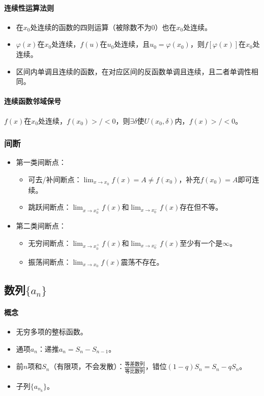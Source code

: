 \documentclass[
12pt, %
a4paper, 
oneside, %
headinclude,footinclude, %
]{scrartcl}
\begin{document}
\paragraph{连续性运算法则}
\begin{itemize}
\item 在$ x_0 $处连续的函数的四则运算（被除数不为$ 0 $）也在$ x_0 $处连续。
\item $ \varphi (x) $在$ x_0 $处连续，$ f(u) $在$ u_0 $处连续，且$ u_0 = \varphi (x_0) $，则$ f[\varphi (x)] $在$ x_0 $处连续。
\item 区间内单调且连续的函数，在对应区间的反函数单调且连续，且二者单调性相同。
\end{itemize}
\paragraph{连续函数邻域保号}
$ f(x) $在$ x_0 $处连续，$ f(x_0) >/< 0 $，则$ \exists \delta $使$ U(x_0, \delta) $内，$ f(x) >/< 0 $。
\subsubsection[间断]{间断}
\begin{itemize}
\item 第一类间断点：
\begin{itemize}
\item 可去/补间断点：$ \lim_{x \to x_0}f(x) = A \neq f(x_0) $，补充$ f(x_0) = A $即可连续。
\item 跳跃间断点：$ \lim_{x \to x_0^+}f(x) $和$ \lim_{x \to x_0^-}f(x) $存在但不等。
\end{itemize}
\item 第二类间断点：
\begin{itemize}
\item 无穷间断点：$ \lim_{x \to x_0^+}f(x) $和$ \lim_{x \to x_0^-}f(x) $至少有一个是$ \infty $。
\item 振荡间断点：$ \lim_{x \to x_0}f(x) $震荡不存在。
\end{itemize}
\end{itemize}
\subsection[数列]{数列$ \{a_n\} $}
\paragraph{概念}
\begin{itemize}
\item 无穷多项的整标函数。
\item 通项$ a_n $：递推$ a_n = S_n - S_{n - 1} $。
\item 前$ n $项和$ S_n $（有限项，不会发散）：$ \frac{\text{等差数列}}{\text{等比数列}} $，错位$ (1-q) S_n = S_n - q S_n $。
\item 子列$ \{a_{n_k}\} $。
\end{itemize}
\end{document}
